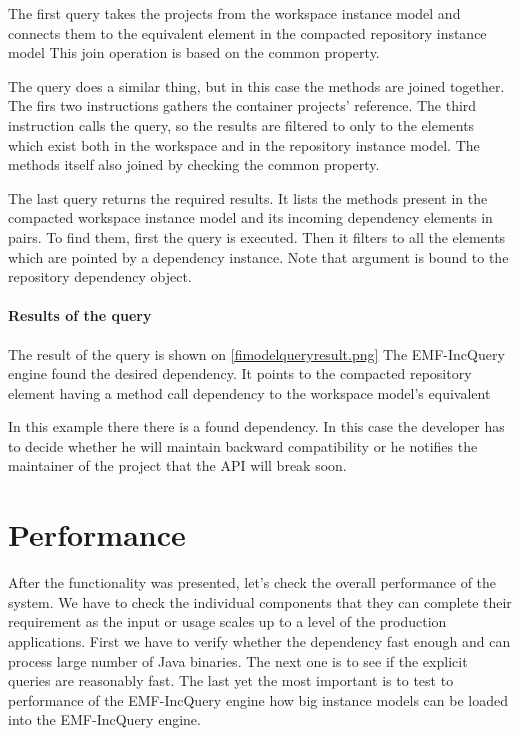 The first  query takes the projects from the workspace
instance model and connects them to the equivalent element in the compacted
repository instance model This join operation is based on the common 
property.

The  query does a similar thing, but in this case the methods
are joined together. The firs two instructions gathers the container projects'
reference. The third instruction calls the  query, so the 
results are filtered to only to the elements which exist both in the workspace
and in the repository instance model. The methods itself also joined by 
checking the common  property.

The last  query returns the required results. It lists
the methods present in the compacted workspace instance model and its incoming
dependency elements in pairs. To find them, first the  query
is executed. Then it filters to all the elements which are pointed by a
dependency instance. Note that  argument is bound to the
repository dependency object.


\paragraph{Results of the query}
The result of the query is shown on \autoref{fimodelqueryresult.png}
The EMF-IncQuery engine found the desired dependency. It points to the compacted
repository element having a method call dependency to the workspace model's
equivalent

In this example there there is a found dependency. In this case the developer 
has to decide whether he will maintain backward compatibility or he notifies the
maintainer of the  project that the API will break soon.

\section{Performance}
After the functionality was presented, let's check the overall performance of
the system. We have to check the individual components  that they can complete
their requirement as the input or usage scales up to a level of the production
applications. First we have to verify whether the dependency fast enough and can
process large number of Java binaries. The next one is to see if the explicit
queries are reasonably fast. The last yet the most important is to test to
performance of the EMF-IncQuery engine how big instance models can be loaded
into the EMF-IncQuery engine.

